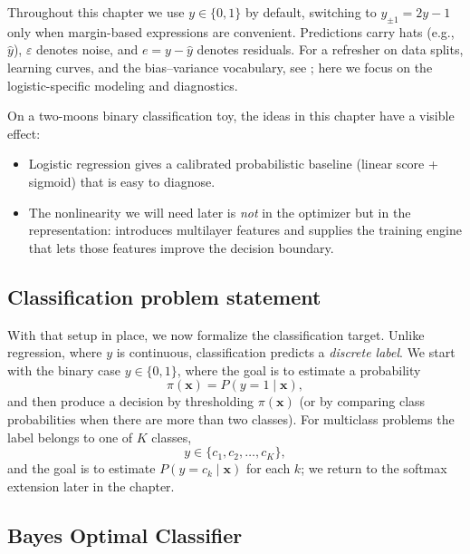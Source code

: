 Throughout this chapter we use \(y\in\{0,1\}\) by default, switching to \(y_{\pm1}=2y-1\) only when margin-based expressions are convenient. Predictions carry hats (e.g., \(\hat{y}\)), \(\varepsilon\) denotes noise, and \(e=y-\hat{y}\) denotes residuals. For a refresher on data splits, learning curves, and the bias--variance vocabulary, see ; here we focus on the logistic-specific modeling and diagnostics.

\begin{tcolorbox}[summarybox, title={Worked example: a toy decision boundary}]
On a two\hyp{}moons binary classification toy, the ideas in this chapter have a visible effect:
\begin{itemize}
    \item Logistic regression gives a calibrated probabilistic baseline (linear score + sigmoid) that is easy to diagnose.
    \item The nonlinearity we will need later is \emph{not} in the optimizer but in the representation:  introduces multilayer features and  supplies the training engine that lets those features improve the decision boundary.
\end{itemize}
\end{tcolorbox}

\subsection{Classification problem statement}
\label{sec:logistic_classification_problem_statement}

With that setup in place, we now formalize the classification target. Unlike regression, where \(y\) is continuous, classification predicts a \emph{discrete label}. We start with the binary case \(y\in\{0,1\}\), where the goal is to estimate a probability
\[
\pi(\mathbf{x}) = P(y=1\mid \mathbf{x}),
\]
and then produce a decision by thresholding \(\pi(\mathbf{x})\) (or by comparing class probabilities when there are more than two classes). For multiclass problems the label belongs to one of \(K\) classes,
\[
y \in \{c_1, c_2, \ldots, c_K\},
\]
and the goal is to estimate \(P(y=c_k\mid \mathbf{x})\) for each \(k\); we return to the softmax extension later in the chapter.

\subsection{Bayes Optimal Classifier}
\label{sec:logistic_bayes_optimal_classifier}

